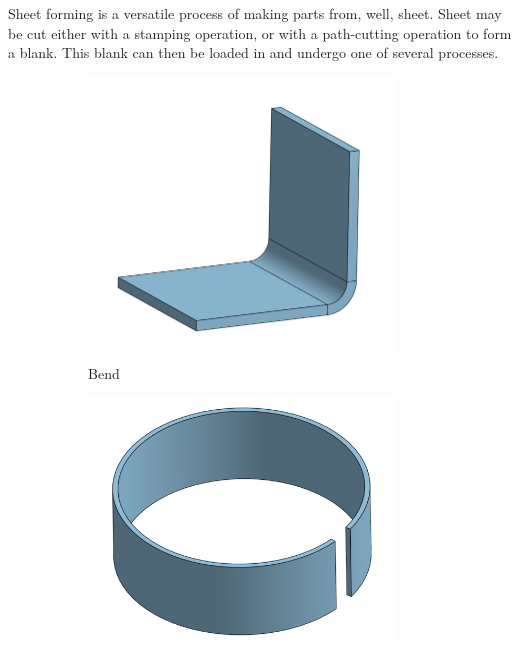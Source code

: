 \documentclass[10pt,letterpaper]{book}
\begin{document}
 Sheet forming is a versatile process of making parts from, well, sheet. Sheet may be cut either with a stamping operation, or with a path-cutting operation to form a blank. This blank can then be loaded in and undergo one of several processes.
 
 	\begin{figure}[H]
		\centering
		\begin{subfigure}[b]{.24\linewidth}
			\includegraphics[width=0.9\textwidth]{imgs/sheet_bend.png}
			\caption{Bend}
		\end{subfigure}\begin{subfigure}[b]{.24\linewidth}
			\includegraphics[width=0.9\textwidth]{imgs/sheet_roll.png}

\end{subfigure}
\end{figure}
\end{document}
